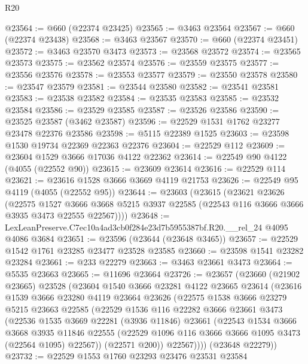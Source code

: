 \begin{lexlean}{R20}
\begin{coremodule}
@23564 := @660 (@22374 @23425)
@23565 := @3463 @23564
@23567 := @660 (@22374 @23438)
@23568 := @3463 @23567
@23570 := @660 (@22374 @23451)
@23572 := @3463 @23570 @3473
@23573 := @23568 @23572
@23574 := @23565 @23573
@23575 := @23562 @23574
@23576 := @23559 @23575
@23577 := @23556 @23576
@23578 := @23553 @23577
@23579 := @23550 @23578
@23580 := @23547 @23579
@23581 := @23544 @23580
@23582 := @23541 @23581
@23583 := @23538 @23582
@23584 := @23535 @23583
@23585 := @23532 @23584
@23586 := @23529 @23585
@23587 := @23526 @23586
@23590 := @23525 @23587 (@3462 @23587)
@23596 := @22529 @1531 @1762 @23277 @23478 @22376 @23586
@23598 := @5115 @22389 @1525
@23603 := @23598 @1530 @19734 @22369 @22363 @22376
@23604 := @22529 @112
@23609 := @23604 @1529 @3666 @17036 @4122 @22362
@23614 := @22549 @90 @4122 (@4055 (@22552 @90))
@23615 := @23609 @23614
@23616 := @22529 @114
@23621 := @23616 @1528 @3666 @3669 @4119 @21753
@23626 := @22549 @95 @4119 (@4055 (@22552 @95))
@23644 := @23603
    (@23615
      (@23621
        @23626
        (@22575
          @1527
          @3666
          @3668
          @5215
          @3937
          @22585
          (@22543 @116 @3666 @3666 @3935 @3473 @22555 @22567))))
@23648 := LexLeanPreserve.C7ec10a4ad3cb0f284e23d7b5955387bf.R20.__rel_24 @4095 @4086 @3684
@23651 := @23596 (@23644 (@23648 @3465))
@23657 := @22529 @1542 @1761 @23285 @23477 @23528 @23585
@23660 := @23598 @1541 @23282 @23284
@23661 := @233 @22279
@23663 := @3463 @23661 @3473
@23664 := @5535 @23663
@23665 := @11696 @23664
@23726 := @23657
    (@23660
      (@21902 @23665)
      @23528
      (@23604
        @1540
        @3666
        @23281
        @4122
        @23665
        @23614
        (@23616
          @1539
          @3666
          @23280
          @4119
          @23664
          @23626
          (@22575
            @1538
            @3666
            @23279
            @5215
            @23663
            @22585
            (@22529
              @1536
              @116
              @22282
              @3666
              @23661
              @3473
              (@22536
                @1535
                @3669
                @22281
                (@3936 @11846)
                @23661
                (@22543
                  @1534
                  @3666
                  @3668
                  @3935
                  @11846
                  @22555
                  (@22529 @1096 @116 @3666 @3666 @1095 @3473 (@22564 @1095) @22567))
                (@22571 @200))
              @22567))))
      (@23648 @22279))
@23732 := @22529 @1553 @1760 @23293 @23476 @23531 @23584

\end{coremodule}
\end{lexlean}
